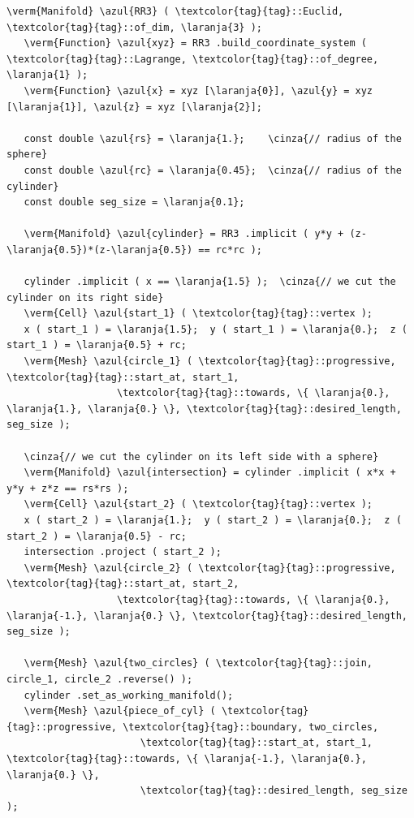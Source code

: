 \begin{Verbatim}[commandchars=\\\{\},formatcom=\small\tt,frame=single,
   label=parag-\ref{\numb section 3.\numb parag 18}.cpp,rulecolor=\color{coment},
   baselinestretch=0.94,framesep=2mm                                            ]
   \verm{Manifold} \azul{RR3} ( \textcolor{tag}{tag}::Euclid, \textcolor{tag}{tag}::of_dim, \laranja{3} );
   \verm{Function} \azul{xyz} = RR3 .build_coordinate_system ( \textcolor{tag}{tag}::Lagrange, \textcolor{tag}{tag}::of_degree, \laranja{1} );
   \verm{Function} \azul{x} = xyz [\laranja{0}], \azul{y} = xyz [\laranja{1}], \azul{z} = xyz [\laranja{2}];

   const double \azul{rs} = \laranja{1.};    \cinza{// radius of the sphere}
   const double \azul{rc} = \laranja{0.45};  \cinza{// radius of the cylinder}
   const double seg_size = \laranja{0.1};

   \verm{Manifold} \azul{cylinder} = RR3 .implicit ( y*y + (z-\laranja{0.5})*(z-\laranja{0.5}) == rc*rc );

   cylinder .implicit ( x == \laranja{1.5} );  \cinza{// we cut the cylinder on its right side}
   \verm{Cell} \azul{start_1} ( \textcolor{tag}{tag}::vertex );
   x ( start_1 ) = \laranja{1.5};  y ( start_1 ) = \laranja{0.};  z ( start_1 ) = \laranja{0.5} + rc;
   \verm{Mesh} \azul{circle_1} ( \textcolor{tag}{tag}::progressive, \textcolor{tag}{tag}::start_at, start_1,
                   \textcolor{tag}{tag}::towards, \{ \laranja{0.}, \laranja{1.}, \laranja{0.} \}, \textcolor{tag}{tag}::desired_length, seg_size );

   \cinza{// we cut the cylinder on its left side with a sphere}
   \verm{Manifold} \azul{intersection} = cylinder .implicit ( x*x + y*y + z*z == rs*rs );
   \verm{Cell} \azul{start_2} ( \textcolor{tag}{tag}::vertex );
   x ( start_2 ) = \laranja{1.};  y ( start_2 ) = \laranja{0.};  z ( start_2 ) = \laranja{0.5} - rc;
   intersection .project ( start_2 );
   \verm{Mesh} \azul{circle_2} ( \textcolor{tag}{tag}::progressive, \textcolor{tag}{tag}::start_at, start_2,
                   \textcolor{tag}{tag}::towards, \{ \laranja{0.}, \laranja{-1.}, \laranja{0.} \}, \textcolor{tag}{tag}::desired_length, seg_size );

   \verm{Mesh} \azul{two_circles} ( \textcolor{tag}{tag}::join, circle_1, circle_2 .reverse() );
   cylinder .set_as_working_manifold();
   \verm{Mesh} \azul{piece_of_cyl} ( \textcolor{tag}{tag}::progressive, \textcolor{tag}{tag}::boundary, two_circles,
                       \textcolor{tag}{tag}::start_at, start_1, \textcolor{tag}{tag}::towards, \{ \laranja{-1.}, \laranja{0.}, \laranja{0.} \},
                       \textcolor{tag}{tag}::desired_length, seg_size                         );


\end{Verbatim}
